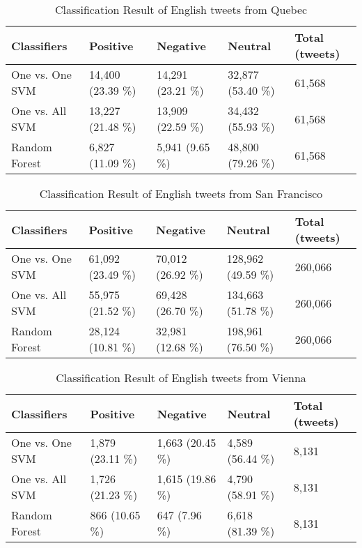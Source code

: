 \begin{table}[ht]
	\caption{Classification Result of English tweets from Quebec}
	\begin{tabular}{|l|p{1.8cm}|p{1.8cm}|p{1.8cm}|p{1.8cm}|} \hline
	Classifiers & Positive & Negative & Neutral & Total (tweets)\\ \hline
	One vs. One SVM & 14,400 (23.39 \%)& 14,291 (23.21 \%)& 32,877 (53.40 \%)& 61,568 \\ \hline
	One vs. All SVM & 13,227 (21.48 \%)& 13,909 (22.59 \%)& 34,432 (55.93 \%)& 61,568 \\ \hline
	Random Forest   & 6,827 (11.09 \%) & 5,941 (9.65 \%) & 48,800 (79.26 \%)& 61,568 \\ \hline
	\end{tabular}
	\label{tab:result_quebec_en}
\end{table}


\begin{table}[ht]
	\caption{Classification Result of English tweets from San Francisco}
	\begin{tabular}{|l|p{1.8cm}|p{1.8cm}|p{1.8cm}|p{1.8cm}|} \hline
	Classifiers & Positive & Negative & Neutral & Total (tweets)\\ \hline
	
	One vs. One SVM & 61,092 (23.49 \%)& 70,012 (26.92 \%)& 128,962 (49.59 \%)& 260,066 \\ \hline
	One vs. All SVM & 55,975 (21.52 \%)& 69,428 (26.70 \%)& 134,663 (51.78 \%)& 260,066 \\ \hline
	Random Forest   & 28,124 (10.81 \%)& 32,981 (12.68 \%)& 198,961 (76.50 \%)& 260,066 \\ \hline
	\end{tabular}
	\label{tab:result_sf_en}
\end{table}


\begin{table}[ht]
	\caption{Classification Result of English tweets from Vienna}
	\begin{tabular}{|l|p{1.8cm}|p{1.8cm}|p{1.8cm}|p{1.8cm}|} \hline
	Classifiers & Positive & Negative & Neutral & Total (tweets)\\ \hline
	
	One vs. One SVM & 1,879 (23.11 \%)& 1,663 (20.45 \%)& 4,589 (56.44 \%)& 8,131 \\ \hline
	One vs. All SVM & 1,726 (21.23 \%)& 1,615 (19.86 \%)& 4,790 (58.91 \%)& 8,131 \\ \hline
	Random Forest   & 866 (10.65 \%) & 647 (7.96 \%) & 6,618 (81.39 \%)& 8,131 \\ \hline
	\end{tabular}
	\label{tab:result_vienna_en}
\end{table}


